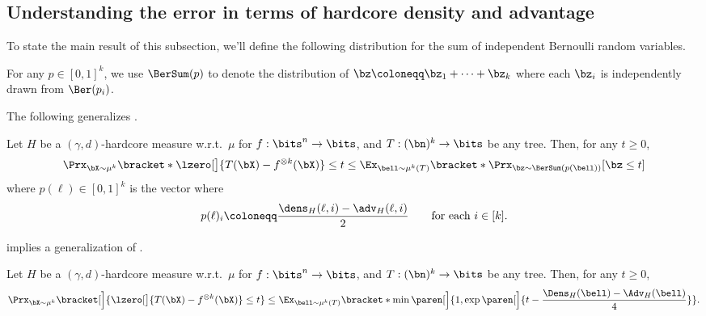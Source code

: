 \subsection{Understanding the error in terms of hardcore density and advantage}
\label{subsec:error-one-leaf}
To state the main result of this subsection, we'll define the following distribution for the sum of independent Bernoulli random variables.
\begin{definition}
    For any $p \in [0,1]^k$, we use $\BerSum(p)$ to denote the distribution of $\bz \coloneqq \bz_1 + \cdots + \bz_k$ where each $\bz_i$ is independently drawn from $\Ber(p_i)$.
\end{definition}
The following generalizes .
\begin{lemma}
    \label{lem:threshold-accuracy-from-stats}
    Let $H$ be a $(\gamma, d)$-hardcore measure w.r.t.~$\mu$ for $f: \bits^n \to \bits$, and $T:(\bn)^k \to \bits$ be any tree. Then, for any $t \geq 0$, 
    \begin{equation*}
        \Prx_{\bX \sim \mu^k}\bracket*{\lzero[\big]{T(\bX)-  f^{\otimes k}(\bX)} \leq t} \leq \Ex_{\bell \sim \mu^k(T)}\bracket*{\Prx_{\bz \sim \BerSum(p(\bell))}[\bz \leq t]}
    \end{equation*}
    where $p(\ell) \in [0,1]^k$ is the vector where
    \begin{equation*}
        p(\ell)_i \coloneqq \frac{\dens_H(\ell,i) - \adv_H(\ell,i)}{2}\quad\quad\text{for each }i \in [k].
    \end{equation*}
\end{lemma}
 implies a generalization of .
\begin{corollary}
    \label{cor:threshold-from-stats-chernoff}
    Let $H$ be a $(\gamma, d)$-hardcore measure w.r.t.~$\mu$ for $f: \bits^n \to \bits$, and $T:(\bn)^k \to \bits$ be any tree. Then, for any $t \geq 0$,
    \begin{equation*}
        \Prx_{\bX \sim \mu^k}\bracket[\Big]{\lzero[\big]{T(\bX)- f^{\otimes k}(\bX)} \leq t} \leq \Ex_{\bell \sim \mu^k(T)}\bracket*{\min\paren[\Big]{1, \exp\paren[\Big]{t - \frac{\Dens_H(\bell) - \Adv_H(\bell)}{4}}}}.
    \end{equation*}
\end{corollary}
